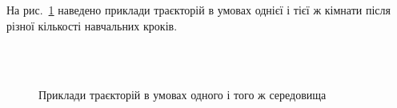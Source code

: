 \documentclass[a4paper,10pt,fleqn]{article}
\begin{document}
На рис.~\ref{fig:learning-samples} наведено приклади траєкторій в умовах однієї і тієї ж кімнати після різної кількості навчальних кроків.
\begin{figure}
  \centering
  \,
   \\
  \,
  \caption{Приклади траєкторій в умовах одного і того ж середовища}
  \label{fig:learning-samples}
\end{figure}
\end{document}
